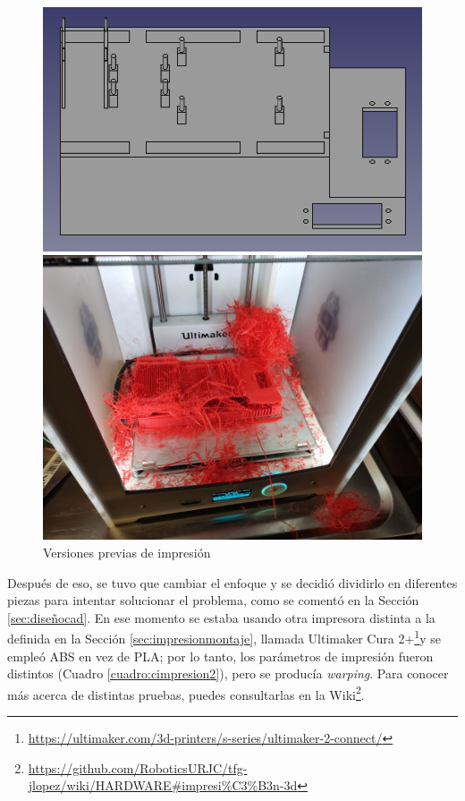 \begin{figure}[ht!]
	\centering
	\begin{minipage}{0.45\linewidth}
		\centering
		\includegraphics[width=\linewidth]{figs/cap7/impresionfallida1.png}
	\end{minipage}
	\hspace{1cm}
	\begin{minipage}{0.40\linewidth}
		\centering
		\includegraphics[width=\linewidth]{figs/cap7/piezav1error.jpeg}
	\end{minipage}
	\caption{Versiones previas de impresión}
	\label{fig:imfallida}
\end{figure}

Después de eso, se tuvo que cambiar el enfoque y se decidió dividirlo en diferentes piezas para intentar solucionar el problema, como se comentó en la Sección \ref{sec:diseñocad}. En ese momento se estaba usando otra impresora distinta a la definida en la Sección \ref{sec:impresionmontaje}, llamada Ultimaker Cura 2+\footnote{\url{https://ultimaker.com/3d-printers/s-series/ultimaker-2-connect/}}y se empleó ABS en vez de PLA; por lo tanto, los parámetros de impresión fueron distintos (Cuadro \ref{cuadro:cimpresion2}), pero se producía \textit{warping}. Para conocer más acerca de distintas pruebas, puedes consultarlas en la Wiki\footnote{\url{https://github.com/RoboticsURJC/tfg-jlopez/wiki/HARDWARE\#impresi\%C3\%B3n-3d}}.

